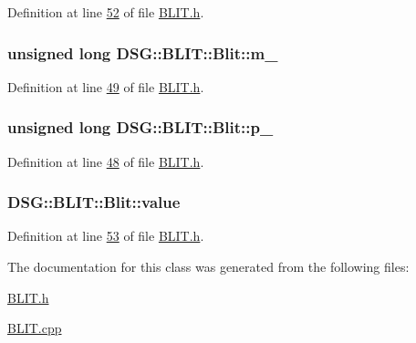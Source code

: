 Definition at line \hyperlink{_b_l_i_t_8h_source_l00052}{52} of file \hyperlink{_b_l_i_t_8h_source}{B\+L\+I\+T.\+h}.

\hypertarget{class_d_s_g_1_1_b_l_i_t_1_1_blit_afa6e4d46efdbfa032762610601ed42a0}{
\subsubsection[{m\+\_\+}]{\setlength{\rightskip}{0pt plus 5cm}unsigned long D\+S\+G\+::\+B\+L\+I\+T\+::\+Blit\+::m\+\_\+\hspace{0.3cm}{\ttfamily [protected]}}}\label{class_d_s_g_1_1_b_l_i_t_1_1_blit_afa6e4d46efdbfa032762610601ed42a0}


Definition at line \hyperlink{_b_l_i_t_8h_source_l00049}{49} of file \hyperlink{_b_l_i_t_8h_source}{B\+L\+I\+T.\+h}.

\hypertarget{class_d_s_g_1_1_b_l_i_t_1_1_blit_a04d7d6b22a386428e5c25668e1587794}{
\subsubsection[{p\+\_\+}]{\setlength{\rightskip}{0pt plus 5cm}unsigned long D\+S\+G\+::\+B\+L\+I\+T\+::\+Blit\+::p\+\_\+\hspace{0.3cm}{\ttfamily [protected]}}}\label{class_d_s_g_1_1_b_l_i_t_1_1_blit_a04d7d6b22a386428e5c25668e1587794}


Definition at line \hyperlink{_b_l_i_t_8h_source_l00048}{48} of file \hyperlink{_b_l_i_t_8h_source}{B\+L\+I\+T.\+h}.

\hypertarget{class_d_s_g_1_1_b_l_i_t_1_1_blit_ac8fb9d4fb45d0697bf364bb5d6b570ce}{
\subsubsection[{value}]{ D\+S\+G\+::\+B\+L\+I\+T\+::\+Blit\+::value\hspace{0.3cm}{\ttfamily [protected]}}}\label{class_d_s_g_1_1_b_l_i_t_1_1_blit_ac8fb9d4fb45d0697bf364bb5d6b570ce}


Definition at line \hyperlink{_b_l_i_t_8h_source_l00053}{53} of file \hyperlink{_b_l_i_t_8h_source}{B\+L\+I\+T.\+h}.



The documentation for this class was generated from the following files\+:\begin{DoxyCompactItemize}
\item 
\hyperlink{_b_l_i_t_8h}{B\+L\+I\+T.\+h}\item 
\hyperlink{_b_l_i_t_8cpp}{B\+L\+I\+T.\+cpp}\end{DoxyCompactItemize}
